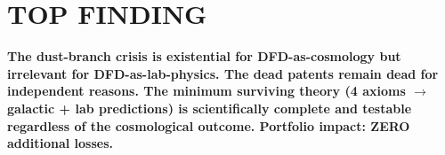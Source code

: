 \documentclass[11pt]{article}
\begin{document}
\section*{TOP FINDING}

\begin{tcolorbox}[colback=blue!5!white, colframe=blue!70!black]
\textbf{The dust-branch crisis is existential for DFD-as-cosmology but
irrelevant for DFD-as-lab-physics. The dead patents remain dead for
independent reasons. The minimum surviving theory (4 axioms $\to$ galactic +
lab predictions) is scientifically complete and testable regardless of the
cosmological outcome. Portfolio impact: ZERO additional losses.}
\end{tcolorbox}
\end{document}
